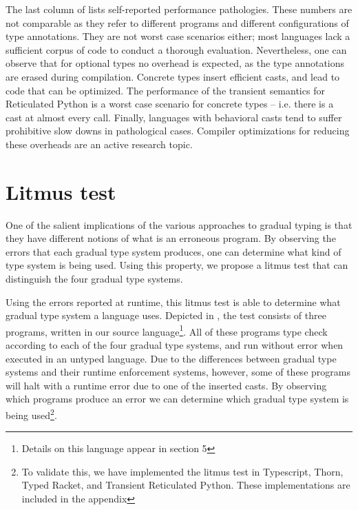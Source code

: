 \documentclass[a4paper,USenglish]{tex/lipics-v2016}
\begin{document}
The last column of  lists self-reported performance
pathologies.  These numbers are not comparable as they refer to different
programs and different configurations of type annotations. They are not
worst case scenarios either; most languages lack a sufficient corpus of code
to conduct a thorough evaluation.  Nevertheless, one can observe that for
optional types no overhead is expected, as the type annotations are erased
during compilation. Concrete types insert efficient casts, and lead to code
that can be optimized.  The performance of the transient semantics for
Reticulated Python is a worst case scenario for concrete types -- i.e. there
is a cast at almost every call. Finally, languages with behavioral casts
tend to suffer prohibitive slow downs in pathological cases. Compiler
optimizations for reducing these overheads are an active research topic.



\section{Litmus test}\label{litmustest}


One of the salient implications of the various approaches to gradual typing is
that they have different notions of what is an erroneous program. By observing
the errors that each gradual type system produces, one can determine what kind
of type system is being used. Using this property, we propose a litmus test
that can distinguish the four gradual type systems.

Using the errors reported at runtime, this litmus test is able to determine
what gradual type system a language uses. Depicted in , the
test consists of three programs, written in our source
language\footnote{Details on this language appear in section 5}. All of these
programs type check according to each of the four gradual type systems, and
run without error when executed in an untyped language. Due to the differences
between gradual type systems and their runtime enforcement systems, however,
some of these programs will halt with a runtime error due to one of the
inserted casts. By observing which programs produce an error we can determine
which gradual type system is being used\footnote{To validate this, we have 
implemented the litmus test in Typescript, Thorn, Typed Racket, and Transient
Reticulated Python. These implementations are included in the appendix}.
\end{document}
